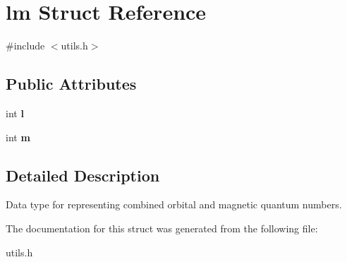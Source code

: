 \hypertarget{structlm}{}\section{lm Struct Reference}
\label{structlm}


{\ttfamily \#include $<$utils.\+h$>$}

\subsection*{Public Attributes}
\begin{DoxyCompactItemize}
\item 
\mbox{\label{structlm_a7b9984283d01c4d8e720fea5412bd498}} 
int {\bfseries l}
\item 
\mbox{\label{structlm_a2884b87159292304e4ee24c9e5c8c507}} 
int {\bfseries m}
\end{DoxyCompactItemize}


\subsection{Detailed Description}
Data type for representing combined orbital and magnetic quantum numbers.~\newline


The documentation for this struct was generated from the following file\+:\begin{DoxyCompactItemize}
\item 
utils.\+h\end{DoxyCompactItemize}
